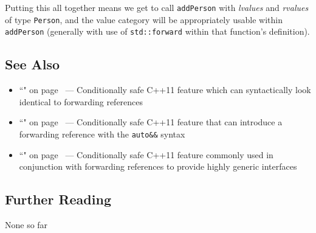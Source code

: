 Putting this all together means we get to call \texttt{addPerson} with
\emph{lvalues} and \emph{rvalues} of type \texttt{Person}, and the value
category will be appropriately usable within \texttt{addPerson}
(generally with use of \texttt{std::forward} within that function's
definition).

\subsection[See Also]{See Also}\label{see-also}

\begin{itemize}
\item{``" on page~\pageref{Rvalue-References} — Conditionally safe C++11 feature which can syntactically look identical to forwarding references}
\item{``" on page~\pageref{auto-feature} — Conditionally safe C++11 feature that can introduce a forwarding reference with the \texttt{auto\&\&} syntax}
\item{``" on page~\pageref{variadictemplate} — Conditionally safe C++11 feature commonly used in conjunction with forwarding references to provide highly generic interfaces}
\end{itemize}

\subsection[Further Reading]{Further Reading}\label{further-reading}

None so far


